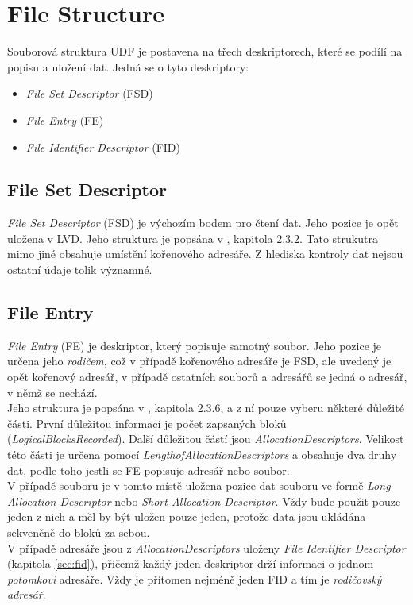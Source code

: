 \section{File Structure}
\label{sec:fsd}
Souborová struktura UDF je postavena na třech deskriptorech, které se podílí na popisu a uložení dat. Jedná se o tyto deskriptory:
\begin{itemize}
    \item \textit{File Set Descriptor} (FSD)
    \item \textit{File Entry} (FE)
    \item \textit{File Identifier Descriptor} (FID)
\end{itemize}

\subsection{File Set Descriptor}
\label{sec:fsd}
\textit{File Set Descriptor} (FSD) je výchozím bodem pro čtení dat. Jeho pozice je opět uložena v LVD. Jeho struktura je popsána v \cite{osta-udf-0201}, kapitola 2.3.2. Tato strukutra mimo jiné obsahuje umístění kořenového adresáře. Z hlediska kontroly dat nejsou ostatní údaje tolik významné.

\subsection{File Entry}
\label{sec:fe}
\textit{File Entry} (FE) je deskriptor, který popisuje samotný soubor. Jeho pozice je určena jeho \textit{rodičem}, což v případě kořenového adresáře je FSD, ale uvedený je opět kořenový adresář, v případě ostatních souborů a adresářů se jedná o adresář, v němž se nechází.\\
Jeho struktura je popsána v \cite{osta-udf-0201}, kapitola 2.3.6, a z ní pouze vyberu některé důležité části. První důležitou informací je počet zapsaných bloků (\textit{LogicalBlocksRecorded}). Další důležitou částí jsou \textit{AllocationDescriptors}. Velikost této části je určena pomocí \textit{LengthofAllocationDescriptors} a obsahuje dva druhy dat, podle toho jestli se FE popisuje adresář nebo soubor.\\
V případě souboru je v tomto místě uložena pozice dat souboru ve formě \textit{Long Allocation Descriptor} nebo \textit{Short Allocation Descriptor}. Vždy bude použit pouze jeden z nich a měl by být uložen pouze jeden, protože data jsou ukládána sekvenčně do bloků za sebou.\\
V případě adresáře jsou z \textit{AllocationDescriptors} uloženy \textit{File Identifier Descriptor} (kapitola \ref{sec:fid}), přičemž každý jeden deskriptor drží informaci o jednom \textit{potomkovi} adresáře. Vždy je přítomen nejméně jeden FID a tím je \textit{rodičovský adresář}. 

